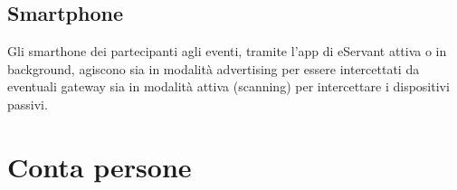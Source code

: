 \begin{figure}[htp]

\end{figure}

\subsection{Smartphone}
Gli smarthone dei partecipanti agli eventi, tramite l'app di eServant attiva o in background, agiscono
sia in modalità advertising per essere intercettati da eventuali gateway sia in modalità attiva (scanning) per 
intercettare i dispositivi passivi.

\section{Conta persone}

